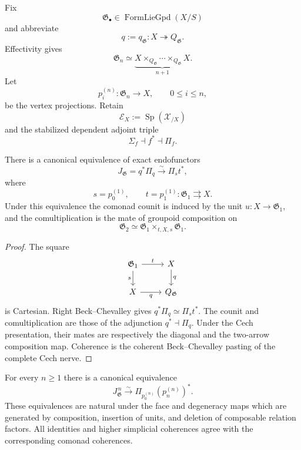 Fix
\[
    \mathfrak G_\bullet
    \in
    \operatorname{FormLieGpd}(X/S)
\]
and abbreviate
\[
    q:=q_{\mathfrak G}:X\twoheadrightarrow Q_{\mathfrak G}.
\]
Effectivity gives
\[
    \mathfrak G_n
    \simeq
    \underbrace{
        X\times_{Q_{\mathfrak G}}\cdots\times_{Q_{\mathfrak G}}X
    }_{n+1}.
\]
Let
\[
    p_i^{(n)}:\mathfrak G_n\longrightarrow X,
    \qquad
    0\leq i\leq n,
\]
be the vertex projections.  Retain
\[
    \mathcal E_X
    :=
    \operatorname{Sp}(\mathcal X_{/X})
\]
and the stabilized dependent adjoint triple
\[
    \Sigma_f\dashv f^*\dashv\Pi_f.
\]

\begin{proposition}
\label{prop:as-degree-one-jet}
There is a canonical equivalence of exact endofunctors
\[
\boxed{
    J_{\mathfrak G}
    =q^*\Pi_q
    \xrightarrow{\sim}
    \Pi_s t^*,
}
\]
where
\[
    s=p_0^{(1)},
    \qquad
    t=p_1^{(1)}:
    \mathfrak G_1\rightrightarrows X.
\]
Under this equivalence the comonad counit is induced by the unit
$u:X\to\mathfrak G_1$, and the comultiplication is the mate of groupoid
composition on
\[
    \mathfrak G_2
    \simeq
    \mathfrak G_1\times_{t,X,s}\mathfrak G_1.
\]
\end{proposition}

\begin{proof}
The square
\[
\begin{tikzcd}
\mathfrak G_1 \arrow[r,"t"] \arrow[d,"s"'] &
X \arrow[d,"q"]\\
X \arrow[r,"q"'] &
Q_{\mathfrak G}
\end{tikzcd}
\]
is Cartesian.  Right Beck--Chevalley gives
$q^*\Pi_q\simeq\Pi_s t^*$.  The counit and comultiplication are those of the
adjunction $q^*\dashv\Pi_q$.  Under the Cech presentation, their mates are
respectively the diagonal and the two-arrow composition map.  Coherence is
the coherent Beck--Chevalley pasting of the complete Cech nerve.
\end{proof}

\begin{theorem}
\label{thm:as-iterated-jet}
For every $n\geq1$ there is a canonical equivalence
\[
\boxed{
    J_{\mathfrak G}^{\,n}
    \xrightarrow{\sim}
    \Pi_{p_0^{(n)}}
    \left(p_n^{(n)}\right)^*.
}
\]
These equivalences are natural under the face and degeneracy maps which are
generated by composition, insertion of units, and deletion of composable
relation factors.  All identities and higher simplicial coherences agree with
the corresponding comonad coherences.
\end{theorem}

